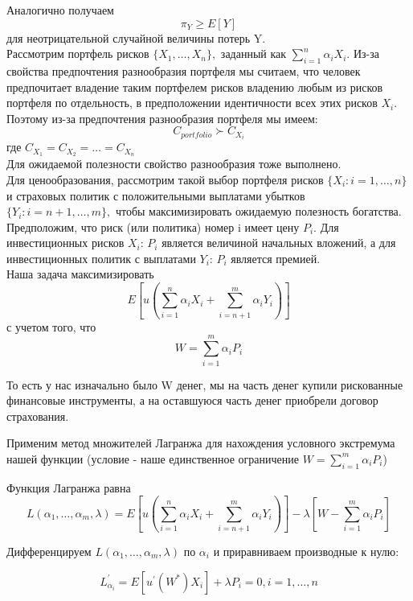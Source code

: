 \documentclass[12pt,a4paper]{article}
\begin{document}
Аналогично получаем  $$  \pi_Y \geq  E \left[ Y \right] $$ для неотрицательной случайной величины потерь Y.\\

Рассмотрим портфель рисков $ \{ X_1, \dots, X_n \} ,$ заданный как $\sum\limits_{i=1}^{n} \alpha_i X_i.$ Из-за свойства предпочтения разнообразия портфеля мы считаем, что человек предпочитает владение таким портфелем рисков владению любым из рисков портфеля по отдельность, в предположении идентичности всех этих рисков $X_i.$ Поэтому из-за предпочтения разнообразия портфеля мы имеем:
$$C_{portfolio} \succ C_{X_i}$$
где $C_{X_1}= C_{X_2} = \dots = C_{X_n}$\\

Для ожидаемой полезности свойство разнообразия тоже выполнено.\\

Для ценообразования, рассмотрим такой выбор портфеля рисков $\{ X_i: i=1, \dots, n \}$ и страховых политик с положительными выплатами убытков $\{ Y_i: i=n+1, \dots, m \}, $ чтобы максимизировать ожидаемую полезность богатства. Предположим, что риск (или политика) номер i имеет цену $P_i.$ Для инвестиционных рисков $X_i$: $P_i$ является величиной начальных вложений, а для инвестиционных политик с выплатами $Y_i$: $P_i$ является премией.\\

Наша задача максимизировать 
$$E \left[ u \left(  \sum\limits_{i=1}^{n} \alpha_i X_i +  \sum\limits_{i=n+1}^{m} \alpha_i Y_i \right)  \right] $$
с учетом того, что $$W=  \sum\limits_{i=1}^{m} \alpha_i P_i$$

То есть у нас изначально было W денег, мы на часть денег купили рискованные финансовые инструменты, а на оставшуюся часть денег приобрели договор страхования.

Применим метод множителей Лагранжа для нахождения условного экстремума нашей функции (условие - наше единственное ограничение  $W=  \sum\limits_{i=1}^{m} \alpha_i P_i$)

Функция Лагранжа  равна
$$  L(\alpha_1, \dots, \alpha_m, \lambda)= E \left[ u \left(  \sum\limits_{i=1}^{n} \alpha_i X_i +  \sum\limits_{i=n+1}^{m} \alpha_i Y_i \right)  \right]  - \lambda  \left[ W - \sum\limits_{i=1}^{m} \alpha_i P_i   \right] $$



Дифференцируем $L(\alpha_1, \dots, \alpha_m, \lambda)$ по $\alpha_i$ и приравниваем производные к нулю:

$$ L^{'}_{\alpha_i}= E \left[  u^{'}(W^{*}) X_i \right]  + \lambda P_i = 0  ,   i = 1, \dots, n$$
\end{document}
